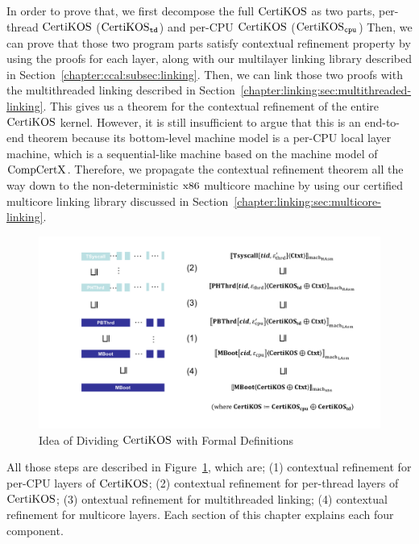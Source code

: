 In order to  prove that, we first decompose the full $\mathrm{CertiKOS}$ as two parts, 
per-thread $\mathrm{CertiKOS}$ ($\mathrm{CertiKOS}_{{\mathrm{\texttt{td}}}}$) and per-CPU $\mathrm{CertiKOS}$ ($\mathrm{CertiKOS}_{{\mathrm{\texttt{cpu}}}}$)
Then, we can prove that those two program parts satisfy contextual refinement property by using the proofs for each layer, 
along with our multilayer linking library described in Section~\ref{chapter:ccal:subsec:linking}. 
Then, we can link those two proofs with the multithreaded linking described in Section~\ref{chapter:linking:sec:multithreaded-linking}. 
This gives us a theorem for the contextual refinement of the entire $\mathrm{CertiKOS}$ kernel. 
However, it is still insufficient to argue that this is an end-to-end theorem because its bottom-level machine model is a per-CPU local layer machine, 
which is a sequential-like machine based on the machine model of 
$\mathrm{CompCertX}$.  %
 Therefore, we propagate the contextual refinement theorem all the way down to the non-deterministic $\mathrm{x86}$ 
 multicore machine by using our certified multicore linking library discussed in Section~\ref{chapter:linking:sec:multicore-linking}.
\begin{figure}
\includegraphics[width=\textwidth, page=1]{figs/certikos/concurrent_linking}
\caption{Idea of Dividing $\mathrm{CertiKOS}$ with Formal Definitions} 
\label{fig:chapter:certikos:idea-of-dividing-certikos-with-formal-def}
\end{figure}
All those steps are described in Figure~\ref{fig:chapter:certikos:idea-of-dividing-certikos-with-formal-def},
which are; (1) contextual refinement for per-CPU layers of $\mathrm{CertiKOS}$; (2) contextual refinement for per-thread layers of $\mathrm{CertiKOS}$;
(3) ontextual refinement for multithreaded linking; (4) contextual refinement for multicore layers.
Each section of this chapter explains each four component.

%
